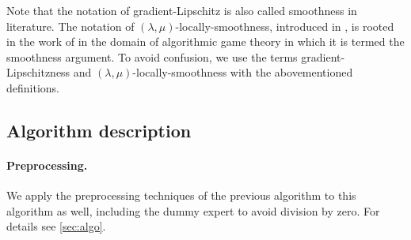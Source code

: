 %

Note that the notation of gradient-Lipschitz is also called smoothness in literature. The notation of $(\lambda,\mu)$-locally-smoothness, introduced in \cite{Thang20:Online-Primal-Dual}, is rooted in the work of \cite{Roughgarden15:Intrinsic-Robustness}
in the domain of algorithmic game theory in which it is termed the smoothness argument.
To avoid confusion, we use the terms gradient-Lipschitzness and $(\lambda,\mu)$-locally-smoothness with the abovementioned definitions.

\subsection{Algorithm description}

\paragraph{Preprocessing.} We apply the preprocessing techniques of the previous algorithm to this algorithm as well, including the dummy expert to avoid division by zero. For details see \cref{sec:algo}.


